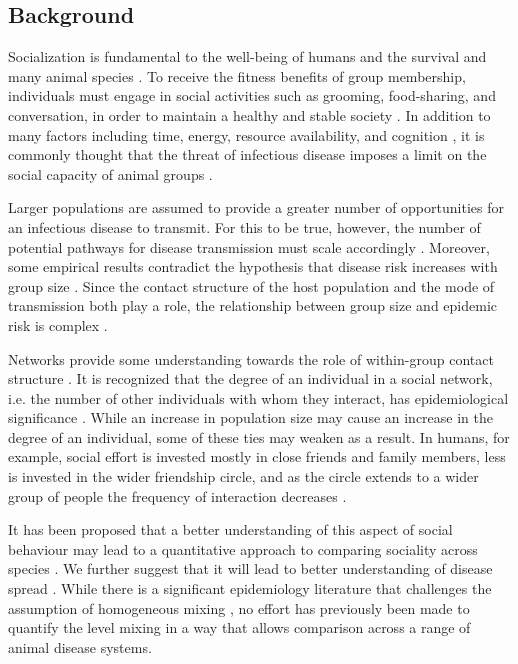 \documentclass[10pt]{article}
\begin{document}
\begin{multicols}{2}
\section{Background}
Socialization is fundamental to the well-being of humans and the survival and many animal species \cite{Brent20170515,10.1371/journal.pmed.1000316,silk2007adaptive}. To receive the fitness benefits of group membership, individuals must engage in social activities such as grooming, food-sharing, and conversation, in order to maintain a healthy and stable society \cite{SUEUR2011156,krause2002living}. In addition to many factors including time, energy, resource availability, and cognition \cite{kappeler2013constraints,LEHMANN20071617}, it is commonly thought that the threat of infectious disease imposes a limit on the social capacity of animal groups \cite{freeland1976pathogens, altizer2003social}.

Larger populations are assumed to provide a greater number of opportunities for an infectious disease to transmit. For this to be true, however, the number of potential pathways for disease transmission must scale accordingly \cite{de1995does,ferrari2011pathogens}. Moreover, some empirical results contradict the hypothesis that disease risk increases with group size \cite{rifkin2012animals,patterson2013parasite}. Since the contact structure of the host population and the mode of transmission both play a role, the relationship between group size and epidemic risk is complex \cite{Smith12052009,ECY:ECY20139492076,borremans2016nonlinear,HOCK201234,Sah18042017}.

Networks provide some understanding towards the role of within-group contact structure \cite{doi:10.1093/beheco/art047}. It is recognized that the degree of an individual in a social network, i.e. the number of other individuals with whom they interact, has epidemiological significance \cite{Bansal879}. While an increase in population size may cause an increase in the degree of an individual, some of these ties may weaken as a result. In humans, for example, social effort is invested mostly in close friends and family members, less is invested in the wider friendship circle, and as the circle extends to a wider group of people the frequency of interaction decreases \cite{MacCarron2016151,saramaki2014persistence,10.1371/journal.pone.0022656}. 

It has been proposed that a better understanding of this aspect of social behaviour may lead to a quantitative approach to comparing sociality across species \cite{dunbar2010bondedness}. We further suggest that it will lead to better understanding of disease spread \cite{karsai2014time}. While there is a significant epidemiology literature that challenges the assumption of homogeneous mixing \cite{anderson1992infectious, castillo1989epidemiological, DelValle2007539, Volz2925}, no effort has previously been made to quantify the level mixing in a way that allows comparison across a range of animal disease systems. 


\end{multicols}
\end{document}
